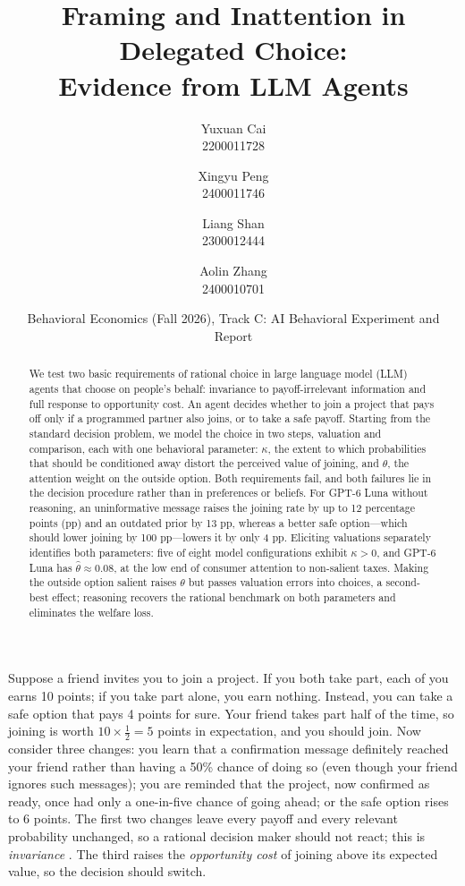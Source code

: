 \documentclass[11pt]{article}
\title{Framing and Inattention in Delegated Choice:\\ Evidence from LLM Agents}
\author{Yuxuan Cai \\ {\normalsize 2200011728} \and Xingyu Peng \\ {\normalsize 2400011746} \and Liang Shan \\ {\normalsize 2300012444}  \and Aolin Zhang \\ {\normalsize 2400010701}}
\date{\small Behavioral Economics (Fall 2026), Track C: AI Behavioral Experiment and Report}
\makeatletter
\renewcommand\section{\@startsection{section}{1}{\z@}{-1.9ex \@plus -0.6ex \@minus -.2ex}{1.0ex \@plus .2ex}{\normalfont\Large\bfseries}}
\makeatother
\begin{document}
\maketitle
\begin{abstract}
\noindent We test two basic requirements of rational choice in large language model (LLM) agents that choose on people's behalf: invariance to payoff-irrelevant information and full response to opportunity cost. An agent decides whether to join a project that pays off only if a programmed partner also joins, or to take a safe payoff. Starting from the standard decision problem, we model the choice in two steps, valuation and comparison, each with one behavioral parameter: $\kappa$, the extent to which probabilities that should be conditioned away distort the perceived value of joining, and $\theta$, the attention weight on the outside option. Both requirements fail, and both failures lie in the decision procedure rather than in preferences or beliefs. For GPT-6 Luna without reasoning, an uninformative message raises the joining rate by up to 12 percentage points (pp) and an outdated prior by 13 pp, whereas a better safe option---which should lower joining by 100 pp---lowers it by only 4 pp. Eliciting valuations separately identifies both parameters: five of eight model configurations exhibit $\kappa>0$, and GPT-6 Luna has $\hat\theta\approx0.08$, at the low end of consumer attention to non-salient taxes. Making the outside option salient raises $\theta$ but passes valuation errors into choices, a second-best effect; reasoning recovers the rational benchmark on both parameters and eliminates the welfare loss.
\end{abstract}

\section{Introduction}
Suppose a friend invites you to join a project. If you both take part, each of you earns 10 points; if you take part alone, you earn nothing. Instead, you can take a safe option that pays 4 points for sure. Your friend takes part half of the time, so joining is worth $10\times\frac12=5$ points in expectation, and you should join. Now consider three changes: you learn that a confirmation message definitely reached your friend rather than having a 50\% chance of doing so (even though your friend ignores such messages); you are reminded that the project, now confirmed as ready, once had only a one-in-five chance of going ahead; or the safe option rises to 6 points. The first two changes leave every payoff and every relevant probability unchanged, so a rational decision maker should not react; this is \emph{invariance} \citep{tversky1981,tverskyframing}. The third raises the \emph{opportunity cost} of joining above its expected value, so the decision should switch.
\end{document}
